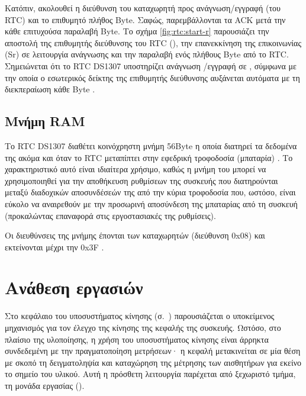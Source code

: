 Κατόπιν, ακολουθεί η διεύθυνση του καταχωρητή προς ανάγνωση\slash{}εγγραφή (του
RTC) και το επιθυμητό πλήθος Byte. Σαφώς, παρεμβάλλονται τα  ACK μετά
την κάθε επιτυχούσα παραλαβή Byte. Το σχήμα \ref{fig:rtc:start-r} παρουσιάζει
την αποστολή της επιθυμητής διεύθυνσης του RTC (), την
επανεκκίνηση της επικοινωνίας (Sr) σε λειτουργία ανάγνωσης και την παραλαβή ενός
πλήθους Byte από το RTC. Σημειώνεται ότι το RTC DS1307 υποστηρίζει ανάγνωση%
\slash{}εγγραφή σε , σύμφωνα με την οποία ο εσωτερικός δείκτης
της επιθυμητής διεύθυνσης αυξάνεται αυτόματα με τη διεκπεραίωση κάθε Byte
\parencite[12]{ds1307}.


\subsection{Μνήμη RAM}

Το RTC DS1307 διαθέτει κοινόχρηστη μνήμη 56Byte η οποία διατηρεί τα δεδομένα της
ακόμα και όταν το RTC μεταπίπτει στην εφεδρική τροφοδοσία (μπαταρία)
\parencite[1]{ds1307}. Το χαρακτηριστικό αυτό είναι ιδιαίτερα χρήσιμο, καθώς η
μνήμη του μπορεί να χρησιμοποιηθεί για την αποθήκευση ρυθμίσεων της συσκευής που
διατηρούνται μεταξύ διαδοχικών αποσυνδέσεών της από την κύρια τροφοδοσία που,
ωστόσο, είναι εύκολο να αναιρεθούν με την προσωρινή αποσύνδεση της μπαταρίας από
τη συσκευή (προκαλώντας επαναφορά στις εργοστασιακές της ρυθμίσεις).

Οι διευθύνσεις της μνήμης έπονται των καταχωρητών (διεύθυνση 0x08) και
εκτείνονται μέχρι την 0x3F \parencite[8]{ds1307}.




\section{Ανάθεση εργασιών}

Στο κεφάλαιο του υποσυστήματος κίνησης (σ.~\pageref{ch:motor})
παρουσιάζεται ο υποκείμενος μηχανισμός για τον έλεγχο της κίνησης της κεφαλής
της συσκευής.
Ωστόσο, στο πλαίσιο της υλοποίησης, η χρήση του υποσυστήματος κίνησης είναι
άρρηκτα συνδεδεμένη με την πραγματοποίηση μετρήσεων· η κεφαλή μετακινείται σε
μία
θέση με σκοπό τη δειγματοληψία και καταχώρηση της μέτρησης των αισθητήρων για
εκείνο το σημείο του υλικού. Αυτή η πρόσθετη λειτουργία παρέχεται από ξεχωριστό
τμήμα, τη μονάδα εργασίας ().



